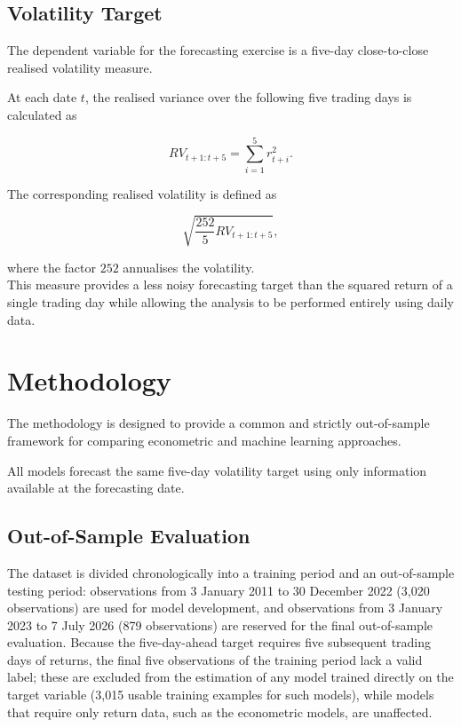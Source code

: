 \documentclass[12pt,a4paper]{article}
\begin{document}
\subsection{Volatility Target}\label{sec:target}
The dependent variable for the forecasting exercise is a five-day close-to-close realised
volatility measure.

At each date $t$, the realised variance over the following five trading days is calculated as

\begin{equation}
RV_{t+1:t+5} =
\sum_{i=1}^{5} r_{t+i}^{2}.
\end{equation}

The corresponding realised volatility is defined as

\begin{equation}
\sqrt{\frac{252}{5}RV_{t+1:t+5}},
\end{equation}

where the factor $252$ annualises the volatility.\\
This measure provides a less noisy forecasting target than the squared return of a single trading
day while allowing the analysis to be performed entirely using daily data.
\section{Methodology}
The methodology is designed to provide a common and strictly out-of-sample framework for comparing
econometric and machine learning approaches.

All models forecast the same five-day volatility target using only information available at
the forecasting date.

\subsection{Out-of-Sample Evaluation}\label{sec:oos}

The dataset is divided chronologically into a training period and an out-of-sample testing period:
observations from 3 January 2011 to 30 December 2022 (3,020 observations) are used for model
development, and observations from 3 January 2023 to 7 July 2026 (879 observations) are reserved
for the final out-of-sample evaluation. Because the five-day-ahead target requires five subsequent
trading days of returns, the final five observations of the training period lack a valid label;
these are excluded from the estimation of any model trained directly on the target variable (3,015
usable training examples for such models), while models that require only return data, such as the
econometric models, are unaffected.
\end{document}
